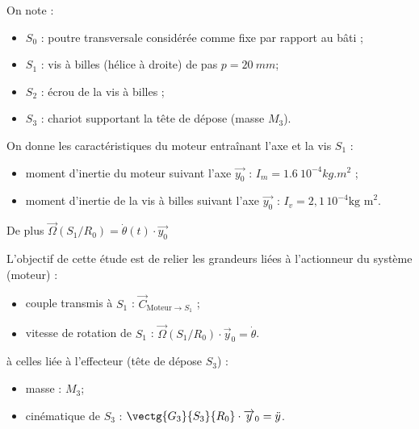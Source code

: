 \begin{multicols}{2}
On note : 
\begin{itemize}
\item $S_0$ : poutre transversale considérée comme fixe par rapport au bâti ;
\item $S_1$ : vis à billes (hélice à droite) de pas $p=\SI{20}{mm}$;
\item $S_2$ : écrou de la vis à billes ;
\item $S_3$ : chariot supportant la tête de dépose (masse $M_3$).
\end{itemize}


On donne les caractéristiques du moteur entraînant l'axe et la vis $S_1$ :
\begin{itemize}
\item moment d'inertie du moteur suivant l'axe $\overrightarrow{y_0}$ : $I_m = \SI{1,6}{10^{-4} kg.m^2}$ ;
\item moment d'inertie de la vis à billes suivant l'axe $\overrightarrow{y_0}$ : $I_v = 2,1\,  10^{-4}\text{kg m}^2$.
\end{itemize}
De plus $\overrightarrow{\Omega}(S_1/R_0)=\dot{\theta}(t)\cdot \overrightarrow{y_0}$

\fi
\begin{obj}
L'objectif de cette étude est de relier les grandeurs liées à l'actionneur du système (moteur) :
\begin{itemize}
\item couple transmis à $S_1$ : $\overrightarrow{C}_{\text{Moteur}\to S_1}$ ;
\item vitesse de rotation de $S_1$ : $\overrightarrow{\Omega}(S_1/R_0)\cdot \overrightarrow{y}_0=\dot{\theta}$.
\end{itemize} 
à celles liée à l'effecteur (tête de dépose $S_3$) : 
\begin{itemize}
\item masse : $M_3$;
\item cinématique de $S_3$ : $\vectg{G_3}{S_3}{R_0}\cdot \overrightarrow{y}_0=\ddot{y}$.
\end{itemize}
\end{obj}






\end{multicols}
